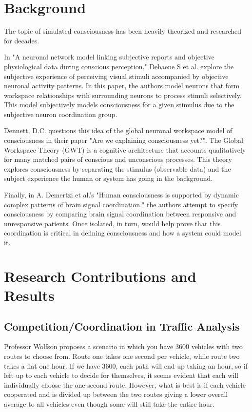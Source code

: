 \documentclass[journal,onecolumn]{IEEEtran}
\begin{document}
\section{Background}

The topic of simulated consciousness has been heavily theorized and researched for decades. 

In "A neuronal network model linking subjective reports and objective physiological data during conscious perception," Dehaene S et al. explore the subjective experience of perceiving visual stimuli accompanied by objective neuronal activity patterns. In this paper, the authors model neurons that form workspace relationships with surrounding neurons to process stimuli selectively. This model subjectively models consciousness for a given stimulus due to the subjective neuron coordination group. 

Dennett, D.C. questions this idea of the global neuronal workspace model of consciousness in their paper "Are we explaining consciousness yet?". The Global Workspace Theory (GWT) is a cognitive architecture that accounts qualitatively for many matched pairs of conscious and unconscious processes. This theory explores consciousness by separating the stimulus (observable data) and the subject experience the human or system has going in the background. 

Finally, in A. Demertzi et al.'s "Human consciousness is supported by dynamic complex patterns of brain signal coordination." the authors attempt to specify consciousness by comparing brain signal coordination between responsive and unresponsive patients. Once isolated, in turn, would help prove that this coordination is critical in defining consciousness and how a system could model it.

\section{Research Contributions and Results}

\subsection{Competition/Coordination in Traffic Analysis}

Professor Wolfson proposes a scenario in which you have 3600 vehicles with two routes to choose from. Route one takes one second per vehicle, while route two takes a flat one hour. If we have 3600, each path will end up taking an hour, so if left up to each vehicle to decide for themselves, it seems evident that each will individually choose the one-second route. However, what is best is if each vehicle cooperated and is divided up between the two routes giving a lower overall average to all vehicles even though some will still take the entire hour. 
\end{document}
